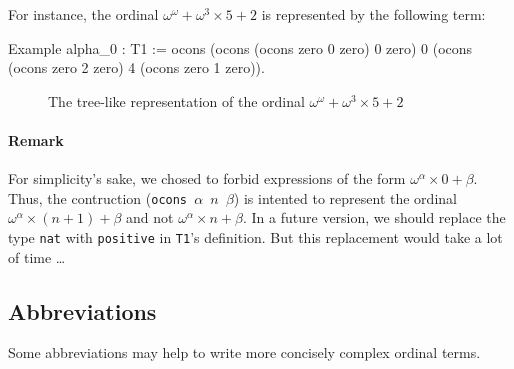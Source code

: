 \label{alpha0-def}
For instance, the ordinal  $\omega^\omega+\omega^3\times 5+2$ is represented by the following term:

\begin{Coqsrc}
Example alpha_0 : T1 :=
  ocons (ocons (ocons zero 0 zero)
               0
               zero)
        0
       (ocons (ocons zero 2 zero)
              4
              (ocons zero 1 zero)).
\end{Coqsrc}


\begin{figure}[htb]
\centering
{}

\caption{The tree-like representation of the ordinal $\omega^\omega+\omega^3\times 5 +2$\label{fig:cnf-tree}}

\end{figure}



\paragraph{Remark}
For simplicity's sake, we chosed to forbid  expressions of the form $\omega^\alpha\times 0 + \beta$. Thus, the contruction (\texttt{ocons $\alpha$ $n$ $\beta$}) is intented to represent the
ordinal $\omega^\alpha\times(n+1)+\beta$ and not $\omega^\alpha\times n+\beta$.
In a future version, we should replace  the type \texttt{nat} with \texttt{positive} in \texttt{T1}'s 
definition. But this replacement would take a lot of time \dots{}

\subsection{Abbreviations}

Some abbreviations may help to write more concisely complex ordinal terms.

